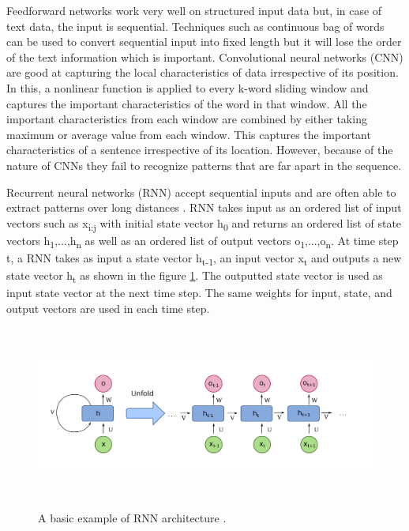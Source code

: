 \documentclass[a4paper, 11pt]{article}
\begin{document}
Feedforward networks work very well on structured input data but, in case of text data, the input is sequential. Techniques such as continuous bag of words \cite{DBLP:journals/corr/abs-1301-3781} can be used to convert sequential input into fixed length but it will lose the order of the text information which is important. Convolutional neural networks (CNN) \cite{Bengio1997} are good at capturing the local characteristics of data irrespective of its position. In this, a nonlinear function is applied to every k-word sliding window and captures the important characteristics of the word in that window. All the important characteristics from each window are combined by either taking maximum or average value from each window. This captures the important characteristics of a sentence irrespective of its location. However, because of the nature of CNNs they fail to recognize patterns that are far apart in the sequence.

Recurrent neural networks (RNN) accept sequential inputs and are often able to extract patterns over long distances \cite{Elman}. RNN takes input as an ordered list of input vectors such as x\textsubscript{i:j} with initial state vector h\textsubscript{0} and returns an ordered list of state vectors h\textsubscript{1},...,h\textsubscript{n} as well as an ordered list of output vectors o\textsubscript{1},...,o\textsubscript{n}. At time step t, a RNN takes as input a state vector h\textsubscript{t-1}, an input vector x\textsubscript{t} and outputs a new state vector h\textsubscript{t} as shown in the figure \ref{fig:A basic RNN architecture}. The outputted state vector is used as input state vector at the next time step. The same weights for input, state, and output vectors are used in each time step.  


\begin{figure}[htpb]
    \centering
    \includegraphics[width=\textwidth,height=6cm,keepaspectratio=true]
    {Recurrent_neural_network_unfold.png}
    \caption{
        A basic example of RNN architecture \cite{WikipediaEN_RNN_unfold}.
    }
    \label{fig:A basic RNN architecture}
\end{figure}
\end{document}

